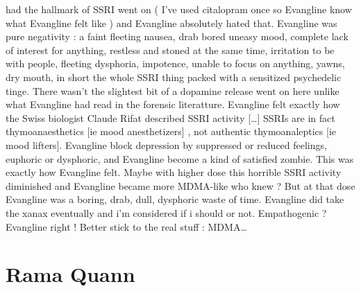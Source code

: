 \documentclass[12pt]{book}
\begin{document}
had the hallmark of SSRI went on ( I've used citalopram once so Evangline know what Evangline felt like ) and Evangline absolutely hated that. Evangline was pure negativity : a faint fleeting nausea, drab bored uneasy mood, complete lack of interest for anything, restless and stoned at the same time, irritation to be with people, fleeting dysphoria, impotence, unable to focus on anything, yawns, dry mouth, in short the whole SSRI thing packed with a sensitized psychedelic tinge. There wasn't the slightest bit of a dopamine release went on here unlike what Evangline had read in the forensic literatture. Evangline felt exactly how the Swiss biologist Claude Rifat described SSRI activity  [\ldots] SSRIs are in fact thymoanaesthetics [ie mood anesthetizers] , not authentic thymoanaleptics [ie mood lifters]. Evangline block depression by suppressed or reduced feelings, euphoric or dysphoric, and Evangline become a kind of satisfied zombie. This was exactly how Evangline felt. Maybe with higher dose this horrible SSRI activity diminished and Evangline became more MDMA-like who knew ? But at that dose Evangline was a boring, drab, dull, dysphoric waste of time. Evangline did take the xanax eventually and i'm considered if i should or not. Empathogenic ? Evangline right ! Better stick to the real stuff : MDMA\ldots



\chapter{Rama Quann}
\end{document}
